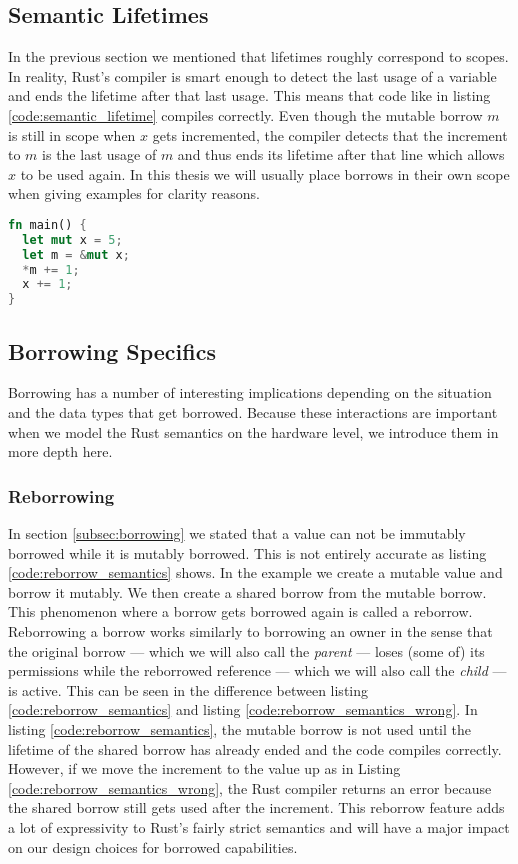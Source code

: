 \subsection{Semantic Lifetimes}
\label{sec:semantic_lifetimes}
In the previous section we mentioned that lifetimes roughly correspond to scopes.
In reality, Rust's compiler is smart enough to detect the last usage of a variable and ends the lifetime after that last usage.
This means that code like in listing \ref{code:semantic_lifetime} compiles correctly.
Even though the mutable borrow $m$ is still in scope when $x$ gets incremented, the compiler detects that the increment to $m$ is the last usage of $m$ and thus ends its lifetime after that line which allows $x$ to be used again.
In this thesis we will usually place borrows in their own scope when giving examples for clarity reasons.
\begin{lstlisting}[language=Rust,frame=single,caption=Lifetime Example,label=code:semantic_lifetime]
fn main() {
  let mut x = 5;
  let m = &mut x;
  *m += 1;
  x += 1;
}
\end{lstlisting}

\subsection{Borrowing Specifics}
Borrowing has a number of interesting implications depending on the situation and the data types that get borrowed.
Because these interactions are important when we model the Rust semantics on the hardware level, we introduce them in more depth here.

\subsubsection{Reborrowing}
\label{sec:backgroundreborrow}
In section \ref{subsec:borrowing} we stated that a value can not be immutably borrowed while it is mutably borrowed.
This is not entirely accurate as listing \ref{code:reborrow_semantics} shows.
In the example we create a mutable value and borrow it mutably.
We then create a shared borrow from the mutable borrow.
This phenomenon where a borrow gets borrowed again is called a reborrow.
Reborrowing a borrow works similarly to borrowing an owner in the sense that the original borrow --- which we will also call the \textit{parent} --- loses (some of) its permissions while the reborrowed reference --- which we will also call the \textit{child} --- is active.
This can be seen in the difference between listing \ref{code:reborrow_semantics} and listing \ref{code:reborrow_semantics_wrong}.
In listing \ref{code:reborrow_semantics}, the mutable borrow is not used until the lifetime of the shared borrow has already ended and the code compiles correctly.
However, if we move the increment to the value up as in Listing \ref{code:reborrow_semantics_wrong}, the Rust compiler returns an error because the shared borrow still gets used after the increment.
This reborrow feature adds a lot of expressivity to Rust's fairly strict semantics and will have a major impact on our design choices for borrowed capabilities.

